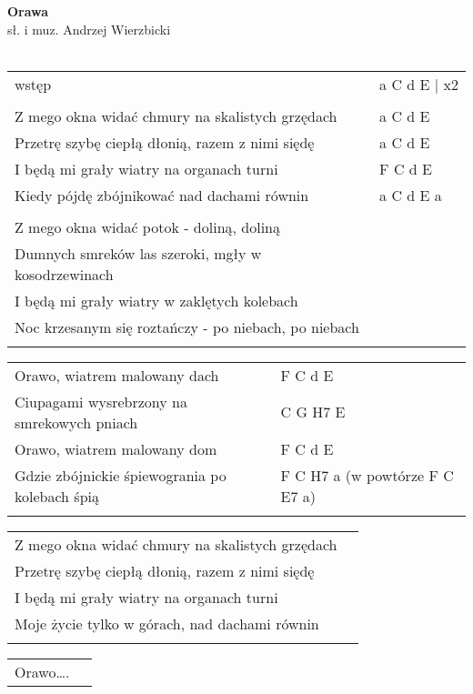 \documentclass[a5paper]{article}
\begin{document}


\noindent
\fontsize{12pt}{15pt}\selectfont
\textbf{Orawa} \\
\fontsize{8pt}{10pt}\selectfont
sł. i muz. Andrzej Wierzbicki \\ \\
\fontsize{10pt}{12pt}\selectfont
{}
\begin{tabular}{@{}p{9.00cm}p{3cm}@{}}
\noindent
wstęp & a C d E | x2 \\ \\
Z mego okna widać chmury na skalistych grzędach & a C d E \\
Przetrę szybę ciepłą dłonią, razem z nimi siędę & a C d E \\
I będą mi grały wiatry na organach turni & F C d E \\
Kiedy pójdę zbójnikować nad dachami równin & a C d E a \\ \\
 
Z mego okna widać potok - doliną, doliną \\
Dumnych smreków las szeroki, mgły w kosodrzewinach \\
I będą mi grały wiatry w zaklętych kolebach \\
Noc krzesanym się roztańczy - po niebach, po niebach \\ \\
\end{tabular}

\noindent
\begin{tabular}{@{}p{8.00cm}p{3cm}@{}} 
Orawo, wiatrem malowany dach & F C d E \\
Ciupagami wysrebrzony na smrekowych pniach & C G H7 E \\
Orawo, wiatrem malowany dom & F C d E \\
Gdzie zbójnickie śpiewogrania po kolebach śpią & F C H7 a (w powtórze F C E7 a) \\ \\
\end{tabular}

\noindent
\begin{tabular}{@{}p{8.00cm}p{3cm}@{}}
Z mego okna widać chmury na skalistych grzędach \\
Przetrę szybę ciepłą dłonią, razem z nimi siędę \\
I będą mi grały wiatry na organach turni \\
Moje życie tylko w górach, nad dachami równin \\ \\
\end{tabular}

\noindent
\begin{tabular}{@{}p{8.00cm}p{3cm}@{}}
Orawo….
\end{tabular}
\end{document}
